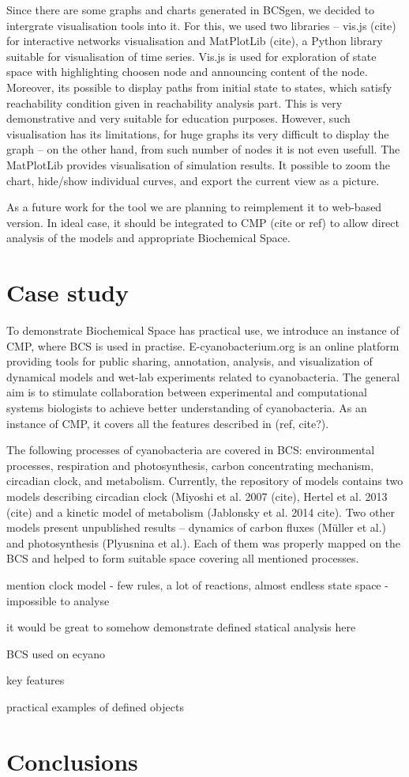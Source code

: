 \documentclass[12pt]{fithesis2}
\begin{document}
Since there are some graphs and charts generated in BCSgen, we decided to intergrate visualisation tools into it. For this, we used two libraries -- vis.js (cite) for interactive networks visualisation and MatPlotLib (cite), a Python library suitable for visualisation of time series. Vis.js is used for exploration of state space with highlighting choosen node and announcing content of the node. Moreover, its possible to display paths from initial state to states, which satisfy reachability condition given in reachability analysis part. This is very demonstrative and very suitable for education purposes. However, such visualisation has its limitations, for huge graphs its very difficult to display the graph -- on the other hand, from such number of nodes it is not even usefull. The MatPlotLib provides visualisation of simulation results. It possible to zoom the chart, hide/show individual curves, and export the current view as a picture.

As a future work for the tool we are planning to reimplement it to web-based version. In ideal case, it should be integrated to CMP (cite or ref) to allow direct analysis of the models and appropriate Biochemical Space.  

\chapter{Case study}

To demonstrate Biochemical Space has practical use, we introduce an instance of CMP, where BCS is used in practise. E-cyanobacterium.org is an online platform providing tools for public sharing, annotation, analysis, and visualization of dynamical models and wet-lab experiments related to cyanobacteria. The general aim is to stimulate collaboration between experimental and computational systems biologists to achieve better understanding of cyanobacteria. As an instance of CMP, it covers all the features described in (ref, cite?).

The following processes of cyanobacteria are covered in BCS: environmental processes, respiration and photosynthesis, carbon concentrating mechanism, circadian clock, and metabolism. Currently, the repository of models contains two models describing circadian clock (Miyoshi et al. 2007 (cite), Hertel et al. 2013 (cite) and a kinetic model of metabolism (Jablonsky et al. 2014 cite). Two other models present unpublished results -- dynamics of carbon fluxes (M\"{u}ller et al.) and photosynthesis (Plyusnina et al.). Each of them was properly mapped on the BCS and helped to form suitable space covering all mentioned processes.

mention clock model - few rules, a lot of reactions, almost endless state space - impossible to analyse

it would be great to somehow demonstrate defined statical analysis here

BCS used on ecyano

key features
 
practical examples of defined objects

\chapter{Conclusions}

\printbibliography
\end{document}
